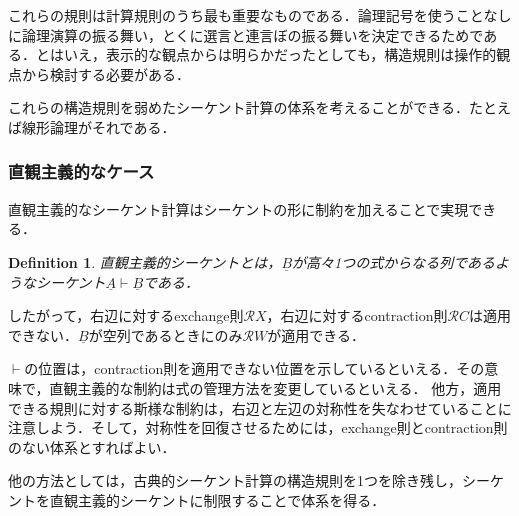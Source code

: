 \documentclass[a4paper,10pt,platex, dvipdfmx]{jsarticle}
\newtheorem{definition}{Definition}
\begin{document}
\begin{enumerate}
\begin{figure}[H]
    \begin{minipage}[b]{0.45\columnwidth}
        \begin{prooftree}
        \end{prooftree}
    \end{minipage}
    \begin{minipage}[b]{0.45\columnwidth}
        \begin{prooftree}
        \end{prooftree}
    \end{minipage}
\end{figure}
\end{enumerate}
これらの規則は計算規則のうち最も重要なものである．論理記号を使うことなしに論理演算の振る舞い，とくに選言と連言ぼの振る舞いを決定できるためである．とはいえ，表示的な観点からは明らかだったとしても，構造規則は操作的観点から検討する必要がある．

これらの構造規則を弱めたシーケント計算の体系を考えることができる．たとえば線形論理がそれである．

\subsubsection{直観主義的なケース}
直観主義的なシーケント計算はシーケントの形に制約を加えることで実現できる．
\begin{definition}
\emph{直観主義的シーケント}とは，$\underline{B}$が高々1つの式からなる列であるようなシーケント$\underline{A}\vdash\underline{B}$である．
\end{definition}
したがって，右辺に対するexchange則$\mathcal{R}X$，右辺に対するcontraction則$\mathcal{R}C$は適用できない．$\underline{B}$が空列であるときにのみ$\mathcal{R}W$が適用できる．

$\vdash$の位置は，contraction則を適用できない位置を示しているといえる．その意味で，直観主義的な制約は式の管理方法を変更しているといえる．
他方，適用できる規則に対する斯様な制約は，右辺と左辺の対称性を失なわせていることに注意しよう．そして，対称性を回復させるためには，exchange則とcontraction則のない体系とすればよい．

他の方法としては，古典的シーケント計算の構造規則を1つを除き残し，シーケントを直観主義的シーケントに制限することで体系を得る．
\end{document}

